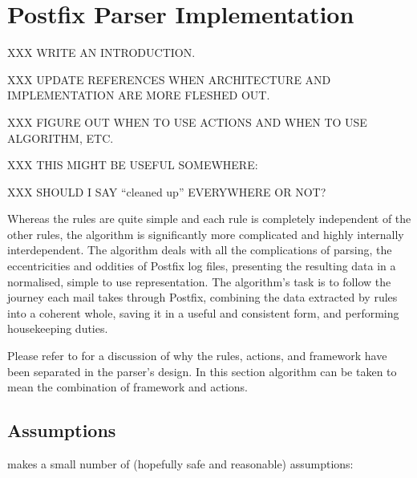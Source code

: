 \chapter{Postfix Parser Implementation}
\label{Postfix Parser Implementation}

XXX WRITE AN INTRODUCTION\@.

XXX UPDATE REFERENCES WHEN ARCHITECTURE AND IMPLEMENTATION ARE MORE FLESHED
OUT\@.

XXX FIGURE OUT WHEN TO USE ACTIONS AND WHEN TO USE ALGORITHM, ETC\@.

XXX THIS MIGHT BE USEFUL SOMEWHERE\@:

XXX SHOULD I SAY ``cleaned up'' EVERYWHERE OR NOT\@?

Whereas the rules are quite simple and each rule is completely independent
of the other rules, the algorithm is significantly more complicated and
highly internally interdependent.  The algorithm deals with all the
complications of parsing, the eccentricities and oddities of Postfix log
files, presenting the resulting data in a normalised, simple to use
representation.  The algorithm's task is to follow the journey each mail
takes through Postfix, combining the data extracted by rules into a
coherent whole, saving it in a useful and consistent form, and performing
housekeeping duties.

Please refer to  for a discussion of why the
rules, actions, and framework have been separated in the parser's design.
In this section algorithm can be taken to mean the combination of framework
and actions.


\section{Assumptions}

\parsername{} makes a small number of (hopefully safe and reasonable)
assumptions:

